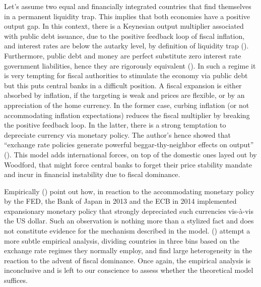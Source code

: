 \documentclass[american]{scrartcl}
\newcommand{\citein}[1]{\citeauthor{#1} (\citeyear{#1})}
\begin{document}
Let's assume two equal and financially integrated countries that find themselves in a permanent liquidity trap. This implies that both economies have a positive output gap. In this context, there is a Keynesian output multiplier associated with public debt issuance, due to the positive feedback loop of fiscal inflation, and interest rates are below the autarky level, by definition of liquidity trap (\cite[p. 41]{Caballero2016}). Furthermore, public debt and money are perfect substitute zero interest rate government liabilities, hence they are rigorously equivalent (\cite[p. 42]{Caballero2016}). In such a regime it is very tempting for fiscal authorities to stimulate the economy via public debt but this puts central banks in a difficult position. A fiscal expansion is either absorbed by inflation, if the targeting is weak and prices are flexible, or by an appreciation of the home currency. In the former case, curbing inflation (or not accommodating inflation expectations) reduces the fiscal multiplier by breaking the positive feedback loop. In the latter, there is a strong temptation to depreciate currency via monetary policy. The author's hence showed that ``exchange rate policies generate powerful beggar-thy-neighbor effects on output'' (\cite[p. 32]{Caballero2016}). This model adds international forces, on top of the domestic ones layed out by Woodford, that might force central banks to forget their price stability mandate and incur in financial instability due to fiscal dominance.

Empirically \citein{Caballero2016} point out how, in reaction to the accommodating monetary policy by the FED, the Bank of Japan in 2013 and the ECB in 2014 implemented expansionary monetary policy that strongly depreciated such currencies vis-à-vis the US dollar. Such an observation is nothing more than a stylized fact and does not constitute evidence for the mechanism described in the model. \citein{Ahmed2021} attempt a more subtle empirical analysis, dividing countries in three bins based on the exchange rate regimes they normally employ, and find large heterogeneity in the reaction to the advent of fiscal dominance. Once again, the empirical analysis is inconclusive and is left to our conscience to assess whether the theoretical model suffices.

\newpage
\printbibliography
\end{document}
